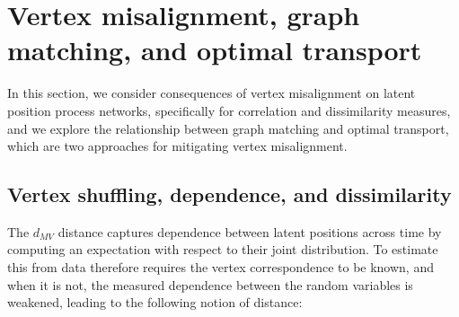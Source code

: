 \documentclass[12pt]{article}
\theoremstyle{definition}
\newcommand{\bX}{\mathbf{X}}
\begin{document}
\section{Vertex misalignment, graph matching, and optimal transport}\label{sec:Main_results_GM_OT}
In this section, we consider consequences of vertex misalignment on latent position process networks, specifically for correlation and dissimilarity measures, and we explore the relationship between graph matching and optimal transport, which are two approaches for mitigating vertex misalignment.

\subsection{Vertex shuffling, dependence, and dissimilarity}\label{sec:D^3}

The $d_{MV}$ distance captures dependence between latent positions across time by computing an expectation with respect to their joint distribution. To estimate this from data therefore requires the vertex correspondence to be known, and when it is not, the measured dependence between the random variables is weakened, leading to the following notion of distance:

\end{document}
